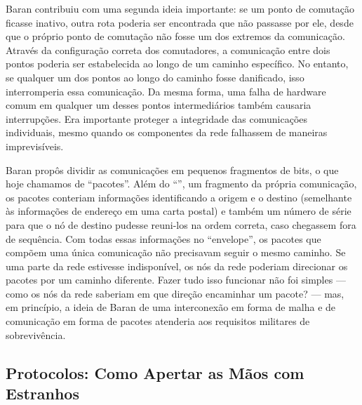 Baran contribuiu com uma segunda ideia importante: se um ponto de comutação ficasse
inativo, outra rota poderia ser encontrada que não passasse por ele, desde que o próprio
ponto de comutação não fosse um dos extremos da comunicação. Através da configuração
correta dos comutadores, a comunicação entre dois pontos poderia ser estabelecida ao
longo de um caminho específico. No entanto, se qualquer um dos pontos ao longo do caminho
fosse danificado, isso interromperia essa comunicação. Da mesma forma, uma falha de
hardware comum em qualquer um desses pontos intermediários também causaria interrupções.
Era importante proteger a integridade das comunicações individuais, mesmo quando os
componentes da rede falhassem de maneiras imprevisíveis.

Baran propôs dividir as comunicações em pequenos fragmentos de bits, o que hoje chamamos
de ``pacotes''. Além do ``'', um fragmento da própria comunicação, os
pacotes conteriam informações identificando a origem e o destino (semelhante às
informações de endereço em uma carta postal) e também um número de série para que o nó de
destino pudesse reuni-los na ordem correta, caso chegassem fora de sequência. Com todas
essas informações no ``envelope'', os pacotes que compõem uma única comunicação não
precisavam seguir o mesmo caminho. Se uma parte da rede estivesse indisponível, os nós da
rede poderiam direcionar os pacotes por um caminho diferente. Fazer tudo isso funcionar não
foi simples --- como os nós da rede saberiam em que direção encaminhar um pacote? --- mas,
em princípio, a ideia de Baran de uma interconexão em forma de malha e de comunicação em
forma de pacotes atenderia aos requisitos militares de sobrevivência.

\subsection{Protocolos: Como Apertar as Mãos com Estranhos}
\label{gatekeepers:protocolos}


